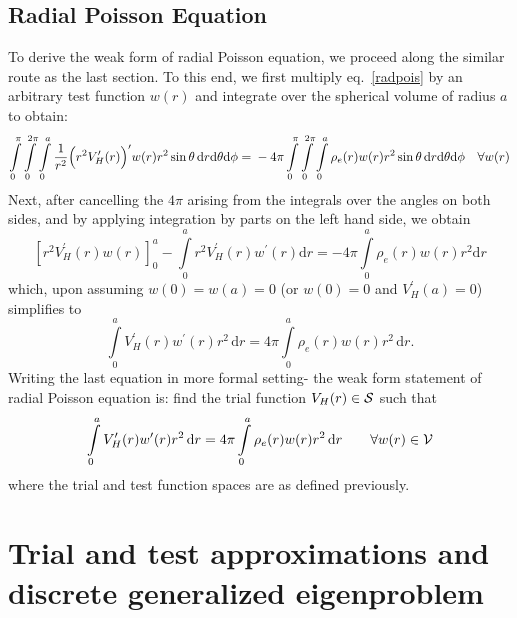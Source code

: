 \documentclass[12pt,dvipsnames]{article}
\begin{document}
\subsection{Radial Poisson Equation}
To derive the weak form of radial Poisson equation, we proceed along the similar route as 
the last section. To this end, we first multiply eq.~\eqref{radpois} by an arbitrary 
test function $w(r)$ and integrate over the spherical volume 
of radius $a$ to obtain: 
\begin{equation*}
\int\limits_0^{\pi} \int\limits_0^{2 \pi} \int\limits_0^a \frac{1}{r^2} \Big( r^2 V^\prime_H(r) \Big)^\prime w(r) r^2 \sin\theta \, \mathrm{d}r \mathrm{d}\theta \mathrm{d}\phi = \\
 - 4 \pi \int\limits_0^{\pi} \int\limits_0^{2 \pi} \int\limits_0^a \rho_e(r) w(r) r^2 \sin\theta \, \mathrm{d}r \mathrm{d}\theta \mathrm{d}\phi \quad \forall w(r)
\end{equation*}
Next, after cancelling the $4 \pi $ arising from the integrals over the angles on both sides, and by 
applying integration by parts on the left hand side, we obtain
\begin{equation*}
\left[ r^2 V^\prime_H(r) w(r) \right]_0^a - \int\limits_0^a r^2 V^\prime_H(r) w^\prime(r) \mathrm{d}r = - 4 \pi \int\limits_0^a \rho_e(r) w(r) r^2 \mathrm{d}r
\end{equation*}
which, upon assuming $w(0) = w(a) = 0$ (or $w(0) = 0$ and $V^\prime_H(a) = 0$) simplifies to
\begin{equation*}
\int\limits_{0}^a V^\prime_H(r) w^\prime(r) r^2 \, \mathrm{d} r = 4 \pi \int\limits_{0}^a \rho_e(r) w(r) r^2 \, \mathrm{d} r.
\end{equation*}
Writing the last equation in more formal setting- the weak form statement of radial Poisson equation is: 
find the trial function $V_H(r) \in {\cal S}$ such that
\begin{equation} \label{weakpois}
\int\limits_{0}^a V^\prime_H(r) w^\prime(r) r^2 \, \mathrm{d} r = 4 \pi \int\limits_{0}^a \rho_e(r) w(r) r^2 \, \mathrm{d} r \qquad \forall w(r) \in {\cal V}
\end{equation}
where the trial and test function spaces are as defined previously.
%
\section{Trial and test approximations and discrete generalized eigenproblem}
\end{document}
